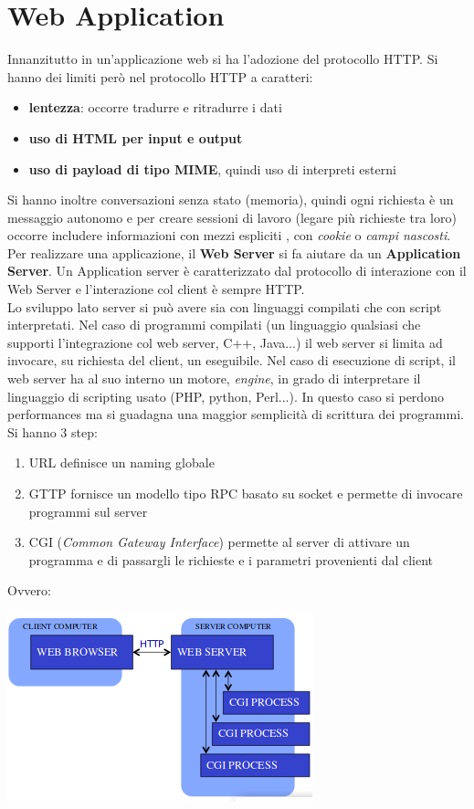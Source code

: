 \documentclass[a4paper,12pt, oneside]{book}
\begin{document}
\section{Web Application}
Innanzitutto in un'applicazione web si ha l'adozione del protocollo HTTP. Si hanno dei limiti però nel protocollo HTTP a caratteri:
\begin{itemize}
	\item \textbf{lentezza}: occorre tradurre e ritradurre i dati 
	\item \textbf{uso di HTML per input e output}
	\item \textbf{uso di payload di tipo MIME}, quindi uso di interpreti esterni
\end{itemize}
Si hanno inoltre conversazioni senza stato (memoria), quindi ogni richiesta è un messaggio autonomo e per creare sessioni di lavoro (legare più richieste tra loro) occorre includere informazioni con mezzi espliciti , con \textit{cookie} o \textit{campi nascosti}.\\
Per realizzare una applicazione, il \textbf{Web Server} si fa aiutare da un \textbf{Application Server}. Un Application server è caratterizzato dal protocollo di interazione con il Web Server e l'interazione col client è sempre HTTP.\\
Lo sviluppo lato server si può avere sia con linguaggi compilati che con script interpretati. Nel caso di programmi compilati (un linguaggio qualsiasi che supporti l'integrazione col web server, C++, Java...) il web server si limita ad invocare, su richiesta del client, un eseguibile. Nel caso di esecuzione di script, il web server ha al suo interno un motore, \textit{engine}, in grado di interpretare il linguaggio di scripting usato (PHP, python, Perl...). In questo caso si perdono performances ma si guadagna una maggior semplicità di scrittura dei programmi.\\
Si hanno 3 step:
\begin{enumerate}
	\item URL definisce un naming globale
	\item GTTP fornisce un modello tipo RPC basato su socket e permette di invocare programmi sul server
	\item CGI (\textit{Common Gateway Interface}) permette al server di attivare un programma e di passargli le richieste e i parametri provenienti dal client 
\end{enumerate}
Ovvero:
\begin{center}
	\includegraphics[scale=0.7]{img/CGI.png}
\end{center}
\end{document}
